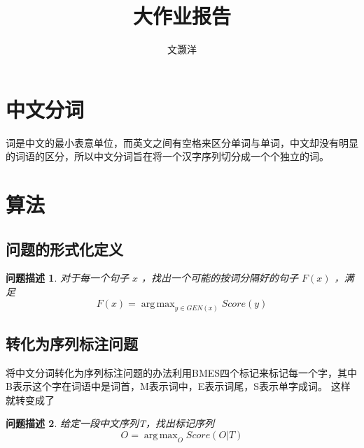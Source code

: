 \documentclass[11pt, a4paper]{article}
\DeclareMathOperator*{\argmax}{arg\,max}
\begin{document}
	\begin{CJK*}{UTF8}{gbsn}
		
		\title{\bf 大作业报告}
		\author{文灏洋}
		\date{}
		\maketitle
		\setlength{\parindent}{2em}
		\renewcommand{\contentsname}{\textbf{目录}}
		\tableofcontents
				
		\newpage
		\section{中文分词}
			词是中文的最小表意单位，而英文之间有空格来区分单词与单词，中文却没有明显的词语的区分，所以中文分词旨在将一个汉字序列切分成一个个独立的词。
		\section{算法}
				\newtheorem*{theorem}{问题描述}

			\subsection{问题的形式化定义}
					\begin{theorem}
						对于每一个句子 $x$ ，找出一个可能的按词分隔好的句子 $F(x)$ ，满足
							 \begin{equation*}
								 F(x) = \argmax_{y\in GEN(x)} Score(y)
							 \end{equation*}
					\end{theorem}
				
			\subsection{转化为序列标注问题}
				将中文分词转化为序列标注问题的办法利用BMES四个标记来标记每一个字，其中B表示这个字在词语中是词首，M表示词中，E表示词尾，S表示单字成词。
				这样就转变成了
					\begin{theorem}
						 给定一段中文序列T，找出标记序列
						 \begin{equation*}
						 O = \argmax_{O}{Score(O|T)}
						 \end{equation*} 
					\end{theorem}

\end{CJK*}
\end{document}
